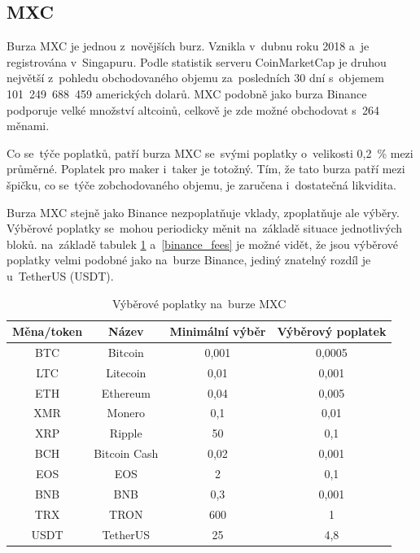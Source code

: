 \documentclass[thesis=B,czech]{FITthesis}[2019/03/21]
\begin{document}
\subsection{MXC}
Burza MXC je jednou z~novějších burz. Vznikla v~dubnu roku 2018 a~je registrována v~Singapuru. Podle statistik serveru CoinMarketCap je druhou největší z~pohledu obchodovaného objemu za~posledních 30 dní s~objemem 101~249~688~459 amerických dolarů. \cite{coinmarketcap} MXC podobně jako burza Binance podporuje velké množství altcoinů, celkově je zde možné obchodovat s~264 měnami. \cite{mxc_coins}

Co se~týče poplatků, patří burza MXC se~svými poplatky o~velikosti 0,2~\% mezi průměrné. Poplatek pro maker i~taker je totožný. Tím, že tato burza patří mezi špičku, co se~týče zobchodovaného objemu, je zaručena i~dostatečná likvidita. \cite{cryptowisser_mxc} 

Burza MXC stejně jako Binance nezpoplatňuje vklady, zpoplatňuje ale výběry. Výběrové poplatky se~mohou periodicky měnit na~základě situace jednotlivých bloků. \cite{mxc_fees} na~základě tabulek \ref{mxc_fees} a~\ref{binance_fees} je možné vidět, že jsou výběrové poplatky velmi podobné jako na~burze Binance, jediný znatelný rozdíl je u~TetherUS (USDT). \cite{cryptowisser_mxc}

\begin{table}\centering
    \caption{Výběrové poplatky na~burze MXC \cite{mxc_fees}}
    \label{mxc_fees}
     \begin{tabular}{||c | c | c | c||} 
     \hline
     Měna/token & Název & Minimální výběr & Výběrový poplatek \\ [0.5ex] 
     \hline\hline
     BTC & Bitcoin & 0,001 & 0,0005 \\ 
     \hline
     LTC & Litecoin & 0,01 & 0,001 \\
     \hline
     ETH & Ethereum & 0,04 & 0,005 \\
     \hline
     XMR & Monero & 0,1 & 0,01 \\
     \hline
     XRP & Ripple & 50 & 0,1 \\
     \hline
     BCH & Bitcoin Cash & 0,02 & 0,001 \\
     \hline
     EOS & EOS & 2 & 0,1 \\
     \hline
     BNB & BNB & 0,3 & 0,001 \\
     \hline
     TRX & TRON & 600 & 1 \\
     \hline
     USDT & TetherUS & 25 & 4,8 \\
     \hline
    \end{tabular}
\end{table}
\end{document}
